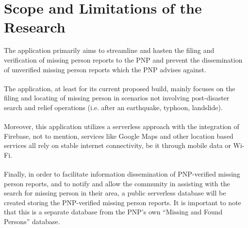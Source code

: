 \section{Scope and Limitations of the Research}
\label{sec:scopelimitations}

The application primarily aims to streamline and hasten the filing and verification of missing person reports to the PNP and prevent the dissemination of unverified missing person reports which the PNP advises against.
\\\\The application, at least for its current proposed build, mainly focuses on the filing and locating of missing person in scenarios not involving post-disaster search and relief operations (i.e. after an earthquake, typhoon, landslide).
\\\\Moreover, this application utilizes a serverless approach with the integration of Firebase, not to mention, services like Google Maps and other location based services all rely on stable internet connectivity, be it through mobile data or Wi-Fi.
\\\\Finally, in order to facilitate information dissemination of PNP-verified missing person reports, and to notify and allow the community in assisting with the search for missing person in their area, a public serverless database will be created storing the PNP-verified missing person reports. It is important to note that this is a separate database from the PNP’s own “Missing and Found Persons” database.
